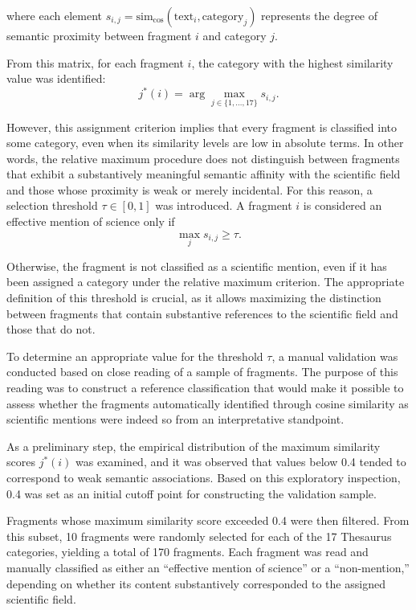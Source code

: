 \documentclass[pdflatex,sn-mathphys-num,iicol]{sn-jnl}
\begin{document}
	where each element $s_{i,j} = \text{sim}_{\cos}(\text{text}_i, \text{category}_j)$ represents the degree of semantic proximity between fragment $i$ and category $j$.
	
	From this matrix, for each fragment $i$, the category with the highest similarity value was identified:
	\[
	j^*(i) = \arg\max_{j \in \{1,\dots,17\}} s_{i,j}.
	\]
	
	However, this assignment criterion implies that every fragment is classified into some category, even when its similarity levels are low in absolute terms. In other words, the relative maximum procedure does not distinguish between fragments that exhibit a substantively meaningful semantic affinity with the scientific field and those whose proximity is weak or merely incidental. For this reason, a selection threshold $\tau \in [0,1]$ was introduced. A fragment $i$ is considered an effective mention of science only if
	\[
	\max_{j} s_{i,j} \geq \tau.
	\]
	
	Otherwise, the fragment is not classified as a scientific mention, even if it has been assigned a category under the relative maximum criterion. The appropriate definition of this threshold is crucial, as it allows maximizing the distinction between fragments that contain substantive references to the scientific field and those that do not.
	
	To determine an appropriate value for the threshold $\tau$, a manual validation was conducted based on close reading of a sample of fragments. The purpose of this reading was to construct a reference classification that would make it possible to assess whether the fragments automatically identified through cosine similarity as scientific mentions were indeed so from an interpretative standpoint.
	
	As a preliminary step, the empirical distribution of the maximum similarity scores $j^*(i)$ was examined, and it was observed that values below 0.4 tended to correspond to weak semantic associations. Based on this exploratory inspection, 0.4 was set as an initial cutoff point for constructing the validation sample.
	
	Fragments whose maximum similarity score exceeded 0.4 were then filtered. From this subset, 10 fragments were randomly selected for each of the 17 Thesaurus categories, yielding a total of 170 fragments. Each fragment was read and manually classified as either an “effective mention of science” or a “non-mention,” depending on whether its content substantively corresponded to the assigned scientific field.
	
\end{document}

